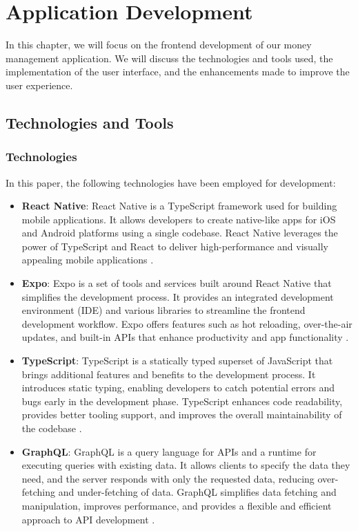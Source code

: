 \newpage
\chapter{Application Development}
\label{chap:frontend}

In this chapter, we will focus on the frontend development of our money management application. We will discuss the technologies and tools used, the implementation of the user interface, and the enhancements made to improve the user experience.

\section{Technologies and Tools}
\label{sec:frontend-tech}
 \subsection{Technologies}
In this paper, the following technologies have been employed for development:



\begin{itemize}
\item \textbf{React Native}: React Native is a TypeScript framework used for building mobile applications. It allows developers to create native-like apps for iOS and Android platforms using a single codebase. React Native leverages the power of TypeScript and React to deliver high-performance and visually appealing mobile applications \cite{reactnative}.

\item \textbf{Expo}: Expo is a set of tools and services built around React Native that simplifies the development process. It provides an integrated development environment (IDE) and various libraries to streamline the frontend development workflow. Expo offers features such as hot reloading, over-the-air updates, and built-in APIs that enhance productivity and app functionality \cite{expo}.

\item \textbf{TypeScript}: TypeScript is a statically typed superset of JavaScript that brings additional features and benefits to the development process. It introduces static typing, enabling developers to catch potential errors and bugs early in the development phase. TypeScript enhances code readability, provides better tooling support, and improves the overall maintainability of the codebase \cite{typescript}.

\item \textbf{GraphQL}: GraphQL is a query language for APIs and a runtime for executing queries with existing data. It allows clients to specify the data they need, and the server responds with only the requested data, reducing over-fetching and under-fetching of data. GraphQL simplifies data fetching and manipulation, improves performance, and provides a flexible and efficient approach to API development \cite{graphql}.
\end{itemize}


